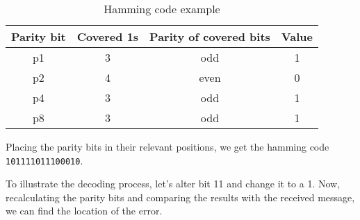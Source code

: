 \def\arraystretch{1.5}
\begin{table}[H]
  \centering

  \medskip

  \begin{tabular}{|c|c|c|c|}
    \hline
    \rowcolor{tabgrey} Parity bit & Covered 1s & Parity of covered bits & Value \\
    \hline
    p1 & 3 & odd & 1 \\
    \hline
    p2 & 4 & even & 0 \\
    \hline
    p4 & 3 & odd & 1 \\
    \hline
    p8 & 3 & odd & 1 \\
    \hline
  \end{tabular}
  \caption{Hamming code example}
  \label{tab:hamming_ex}
\end{table}
\def\arraystretch{1}

Placing the parity bits in their relevant positions, we get the hamming code \texttt{101111011100010}.


To illustrate the decoding process, let's alter bit 11 and change it to a 1.
Now, recalculating the parity bits and comparing the results with the received message, we can find the location of the error.

